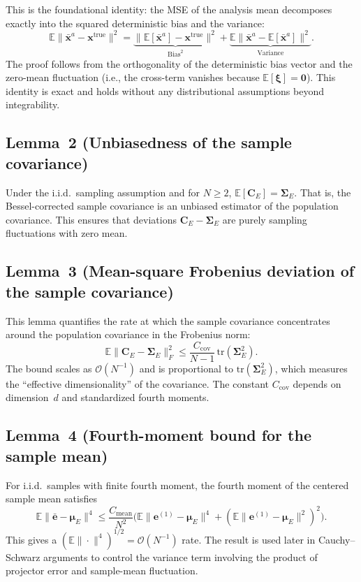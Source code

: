 \documentclass[11pt]{article}
\begin{document}
This is the foundational identity: the MSE of the analysis mean decomposes
exactly into the squared deterministic bias and the variance:
\[
  \mathbb{E}\|\bar{\mathbf{x}}^a - \mathbf{x}^{\mathrm{true}}\|^2
  =
  \underbrace{\|\mathbb{E}[\bar{\mathbf{x}}^a] - \mathbf{x}^{\mathrm{true}}\|^2}
    _{\text{Bias}^2}
  +
  \underbrace{\mathbb{E}\|\bar{\mathbf{x}}^a - \mathbb{E}[\bar{\mathbf{x}}^a]\|^2}
    _{\text{Variance}}.
\]
The proof follows from the orthogonality of the deterministic bias vector and
the zero-mean fluctuation (i.e., the cross-term vanishes because
$\mathbb{E}[\boldsymbol{\xi}] = \mathbf{0}$). This identity is exact and holds
without any distributional assumptions beyond integrability.

\subsection*{Lemma~2 (Unbiasedness of the sample covariance)}

Under the i.i.d.\ sampling assumption and for $N \ge 2$,
$\mathbb{E}[\mathbf{C}_E] = \boldsymbol{\Sigma}_E$. That is, the Bessel-corrected
sample covariance is an unbiased estimator of the population covariance. This
ensures that deviations $\mathbf{C}_E - \boldsymbol{\Sigma}_E$ are purely
sampling fluctuations with zero mean.

\subsection*{Lemma~3 (Mean-square Frobenius deviation of the sample covariance)}

This lemma quantifies the rate at which the sample covariance concentrates
around the population covariance in the Frobenius norm:
\[
  \mathbb{E}\|\mathbf{C}_E - \boldsymbol{\Sigma}_E\|_F^2
  \le
  \frac{C_{\mathrm{cov}}}{N-1}\,
  \mathrm{tr}(\boldsymbol{\Sigma}_E^2).
\]
The bound scales as $\mathcal{O}(N^{-1})$ and is proportional to
$\mathrm{tr}(\boldsymbol{\Sigma}_E^2)$, which measures the ``effective
dimensionality'' of the covariance. The constant $C_{\mathrm{cov}}$ depends on
dimension~$d$ and standardized fourth moments.

\subsection*{Lemma~4 (Fourth-moment bound for the sample mean)}

For i.i.d.\ samples with finite fourth moment, the fourth moment of the
centered sample mean satisfies
\[
  \mathbb{E}\|\bar{\mathbf{e}} - \boldsymbol{\mu}_E\|^4
  \le
  \frac{C_{\mathrm{mean}}}{N^2}\bigl(\mathbb{E}\|\mathbf{e}^{(1)} -
    \boldsymbol{\mu}_E\|^4 + (\mathbb{E}\|\mathbf{e}^{(1)} -
    \boldsymbol{\mu}_E\|^2)^2\bigr).
\]
This gives a $(\mathbb{E}\|\cdot\|^4)^{1/2} = \mathcal{O}(N^{-1})$ rate. The
result is used later in Cauchy--Schwarz arguments to control the variance term
involving the product of projector error and sample-mean fluctuation.
\end{document}

